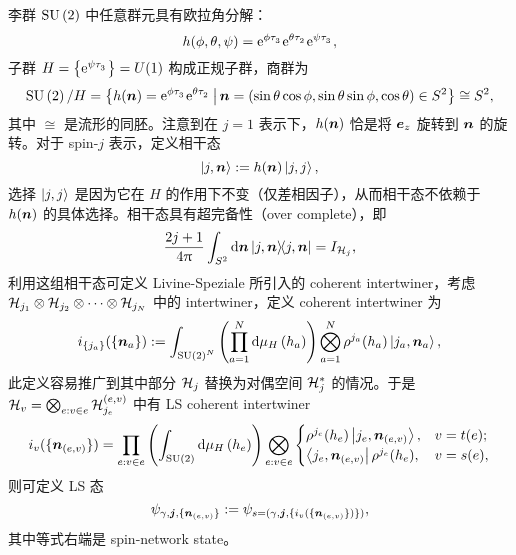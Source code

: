 		李群 $\mathrm{SU}\left(2\right)$ 中任意群元具有欧拉角分解：
		\begin{equation}
			h(\phi,\theta,\psi) = \e{\phi \tensor{\tau}{_3}}\e{\theta \tensor{\tau}{_2}} \e{\psi \tensor{\tau}{_3}},
		\end{equation}
		子群 $H=\left\{ \e{\psi \tensor{\tau}{_3}} \right\} = U(1)$ 构成正规子群，商群为
		\begin{equation}
			\SU{2}/H = \left\{ h(\myvec{n}) = \e{\phi \tensor{\tau}{_3}}\e{\theta \tensor{\tau}{_2}} \,\middle|\, \myvec{n}=\left( \sin\theta \cos\phi, \sin\theta \sin\phi, \cos\theta \right) \in S^2 \right\} \cong S^2,
		\end{equation}
		其中 $\cong$ 是流形的同胚。注意到在 $j=1$ 表示下，$h(\vb*{n})$ 恰是将 $\vb*{e}_z$ 旋转到 $\vb*{n}$ 的旋转。对于 spin-$j$ 表示，定义相干态
		\begin{equation}
			\ket{j,\vb*{n}} := h(\vb*{n}) \ket{j,j},
		\end{equation}
		选择 $\ket{j,j}$ 是因为它在 $H$ 的作用下不变（仅差相因子），从而相干态不依赖于 $h(\vb*{n})$ 的具体选择。相干态具有超完备性（over complete），即
		\begin{equation}
			\frac{2j+1}{4\uppi} \int_{S^2} \dd{\vb*{n}} \op{j,\vb*{n}} = I_{\mathcal{H}_j},
		\end{equation}
		利用这组相干态可定义 Livine-Speziale 所引入的 coherent intertwiner，考虑 $\mathcal{H}_{j_1} \otimes \mathcal{H}_{j_2} \otimes \cdots \otimes \mathcal{H}_{j_N}$ 中的 intertwiner，定义 coherent intertwiner 为
		\begin{equation}
			i_{\{j_a\}}(\{\vb*{n}_a\}) := \int_{\mathrm{SU}\left(2\right)^N} \left( \prod_{a=1}^N \dd{\mu_H}(h_a) \right) \bigotimes_{a=1}^{N} \rho^{j_a}(h_a) \ket{j_a,\vb*{n}_a},
		\end{equation}
		此定义容易推广到其中部分 $\mathcal{H}_j$ 替换为对偶空间 $\mathcal{H}_j^*$ 的情况。于是 $\mathcal{H}_v = \bigotimes_{\substack{e:v\in e}} \mathcal{H}_{j_e}^{(e,v)}$ 中有 LS coherent intertwiner
		\begin{equation}
			i_v(\{\vb*{n}_{(e,v)}\}) = \prod_{e:v\in e} \left( \int_{\mathrm{SU}\left(2\right)} \dd{\mu_H}(h_e) \right) \bigotimes_{e:v\in e}
			\begin{cases}
				\rho^{j_e}(h_e) \ket{j_e,\vb*{n}_{(e,v)}} , & v=t(e);\\
				\bra{j_e,\vb*{n}_{(e,v)}} \rho^{j_e}(h_e) , & v=s(e),
			\end{cases}
		\end{equation}
		则可定义 LS 态
		\begin{equation}
			\psi_{\gamma,\vb*{j},\{\vb*{n}_{(e,v)}\}} := \psi_{s=(\gamma,\vb*{j},\{i_v(\{\vb*{n}_{(e,v)}\})\})},
		\end{equation}
		其中等式右端是 spin-network state。

